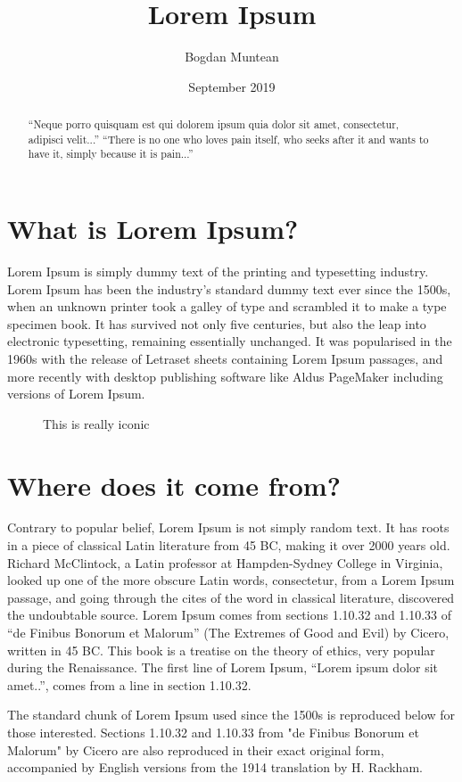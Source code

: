 \documentclass[12pt]{article}
\title{Lorem Ipsum}
\author{Bogdan Muntean}
\date{September 2019}
\begin{document}
\maketitle
\tableofcontents
\begin{abstract}
``Neque porro quisquam est qui dolorem ipsum quia dolor sit amet, consectetur, adipisci velit...''
``There is no one who loves pain itself, who seeks after it and wants to have it, simply because it is pain...''
\end{abstract}

\section{What is Lorem Ipsum?}
Lorem Ipsum is simply dummy text of the printing and typesetting industry. Lorem Ipsum has been the industry's standard dummy text ever since the 1500s, when an unknown printer took a galley of type and scrambled it to make a type specimen book. It has survived not only five centuries, but also the leap into electronic typesetting, remaining essentially unchanged. It was popularised in the 1960s with the release of Letraset sheets containing Lorem Ipsum passages, and more recently with desktop publishing software like Aldus PageMaker including versions of Lorem Ipsum.
\begin{figure}
    \centering
     \caption{This is really iconic}
    \label{fig:li}
\end{figure}
\section{Where does it come from?}

Contrary to popular belief, Lorem Ipsum is not simply random text. It has roots in a piece of classical Latin literature from 45 BC, making it over 2000 years old. Richard McClintock, a Latin professor at Hampden-Sydney College in Virginia, looked up one of the more obscure Latin words, consectetur, from a Lorem Ipsum passage, and going through the cites of the word in classical literature, discovered the undoubtable source. Lorem Ipsum comes from sections 1.10.32 and 1.10.33 of ``de Finibus Bonorum et Malorum'' (The Extremes of Good and Evil) by Cicero, written in 45 BC. This book is a treatise on the theory of ethics, very popular during the Renaissance. The first line of Lorem Ipsum, ``Lorem ipsum dolor sit amet..'', comes from a line in section 1.10.32.

The standard chunk of Lorem Ipsum used since the 1500s is reproduced below for those interested. Sections 1.10.32 and 1.10.33 from "de Finibus Bonorum et Malorum" by Cicero are also reproduced in their exact original form, accompanied by English versions from the 1914 translation by H. Rackham.
\end{document}

